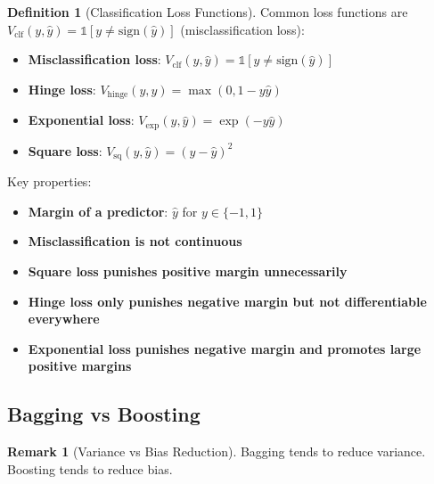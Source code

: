 \documentclass[12pt,a4paper]{article}
\theoremstyle{definition}
\newtheorem{definition}{Definition}[section]
\newtheorem{remark}{Remark}[section]
\begin{document}
\begin{definition}[Classification Loss Functions]
Common loss functions are $V_{\text{clf}}(y,\hat{y}) = \mathbb{1}[y \neq \text{sign}(\hat{y})]$ (misclassification loss):

\begin{itemize}
    \item \textbf{Misclassification loss}: $V_{\text{clf}}(y,\hat{y}) = \mathbb{1}[y \neq \text{sign}(\hat{y})]$
    
    \item \textbf{Hinge loss}: $V_{\text{hinge}}(y,\hat{y}) = \max(0, 1-y\hat{y})$
    
    \item \textbf{Exponential loss}: $V_{\text{exp}}(y,\hat{y}) = \exp(-y\hat{y})$
    
    \item \textbf{Square loss}: $V_{\text{sq}}(y,\hat{y}) = (y-\hat{y})^2$
\end{itemize}

Key properties:

\begin{itemize}
    \item \textbf{Margin of a predictor}: $\hat{y}$ for $y \in \{-1, 1\}$
    
    \item \textbf{Misclassification is not continuous}
    
    \item \textbf{Square loss punishes positive margin unnecessarily}
    
    \item \textbf{Hinge loss only punishes negative margin but not differentiable everywhere}
    
    \item \textbf{Exponential loss punishes negative margin and promotes large positive margins}
\end{itemize}
\end{definition}

\subsection{Bagging vs Boosting}

\begin{remark}[Variance vs Bias Reduction]
Bagging tends to reduce variance. Boosting tends to reduce bias.
\end{remark}

\newpage
\end{document}
